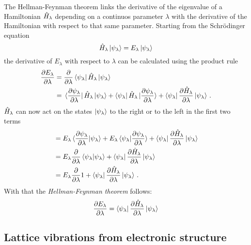 \documentclass[main.tex]{subfiles}
\begin{document}
The Hellman-Feynman theorem \cite{feynman_forces_1939} links the derivative of the eigenvalue of a Hamiltonian \(\hat{H}_{\lambda}\) depending on a continuos parameter \(\lambda\) with the derivative of the Hamiltonian with respect to that same parameter.
Starting from the Schrödinger equation
\begin{equation}
    \hat{H}_{\lambda} \ket{\psi_{\lambda}} = E_{\lambda} \ket{\psi_{\lambda}}
\end{equation}
the derivative of \(E_{\lambda}\) with respect to \(\lambda\) can be calculated using the product rule
\begin{align}
    \pdv{E_{\lambda}}{\lambda} &= \pdv{\lambda} \bra{\psi_{\lambda}} \hat{H}_{\lambda} \ket{\psi_{\lambda}} \\
    &= \bra*{\pdv{\psi_{\lambda}}{\lambda}} \hat{H}_{\lambda} \ket{\psi_{\lambda}} + \bra{\psi_{\lambda}} \hat{H}_{\lambda} \ket*{\pdv{\psi_{\lambda}}{\lambda}} + \bra{\psi_{\lambda}} \pdv{\hat{H}_{\lambda}}{\lambda} \ket{\psi_{\lambda}}\,.
\end{align}
\(\hat{H}_{\lambda}\) can now act on the states \(\ket{\psi_{\lambda}}\) to the right or to the left in the first two terms
\begin{align}
    &= E_{\lambda} \bra*{\pdv{\psi_{\lambda}}{\lambda}} \ket{\psi_{\lambda}} + E_{\lambda} \bra{\psi_{\lambda}} \ket*{\pdv{\psi_{\lambda}}{\lambda}} + \bra{\psi_{\lambda}} \pdv{\hat{H}_{\lambda}}{\lambda} \ket{\psi_{\lambda}} \\
    &= E_{\lambda} \pdv{\lambda} \braket{\psi_{\lambda}} + \bra{\psi_{\lambda}} \pdv{\hat{H}_{\lambda}}{\lambda} \ket{\psi_{\lambda}} \\
    &= E_{\lambda} \pdv{\lambda} 1 + \bra{\psi_{\lambda}} \pdv{\hat{H}_{\lambda}}{\lambda} \ket{\psi_{\lambda}}\,.
\end{align}
With that the \emph{Hellman-Feynman theorem} follows:
\begin{equation}\label{eq:dfpt_hellman_feynman}
    \pdv{E_{\lambda}}{\lambda} = \bra{\psi_{\lambda}} \pdv{\hat{H}_{\lambda}}{\lambda} \ket{\psi_{\lambda}}
\end{equation}

\subsection{Lattice vibrations from electronic structure}
\end{document}
